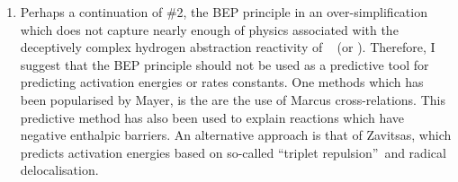 \begin{enumerate}
\item Perhaps a continuation of \#2, the BEP principle in an over-simplification which does not capture nearly enough of physics associated with the deceptively complex hydrogen abstraction reactivity of \cumo~ (or ). Therefore, I suggest that the BEP principle should not be used as a predictive tool for predicting activation energies or rates constants. One methods which has been popularised by Mayer, is the are the use of Marcus cross-relations.\cite{Mayer2010} This predictive method has also been used to explain reactions which have negative enthalpic barriers.\cite{Mader2004} An alternative approach is that of Zavitsas, which predicts activation energies based on so-called ``triplet repulsion''\footnotemark\ and radical delocalisation.\cite{Zavitsas1995, Zavitsas2012}
\end{enumerate}

